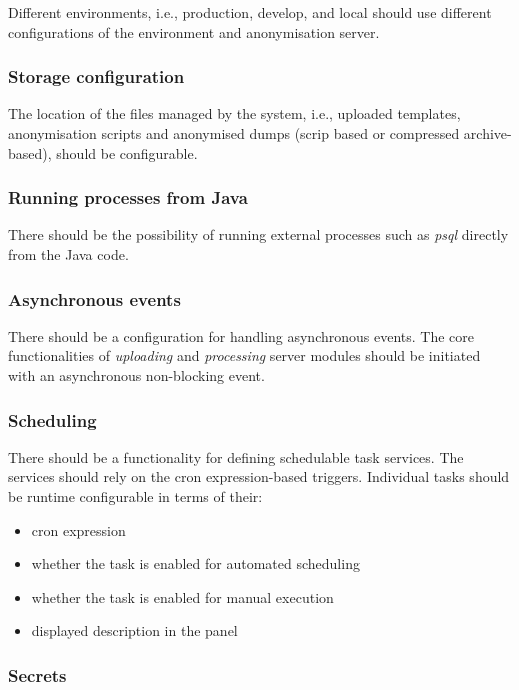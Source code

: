 \documentclass[a4paper,twoside,12pt]{book}
\begin{document}
Different environments, i.e., production, develop, and local should use different configurations of the environment and anonymisation server.

\subsubsection{Storage configuration}

The location of the files managed by the system, i.e., uploaded templates, anonymisation scripts and anonymised dumps (scrip based or compressed archive-based), should be configurable.

\subsubsection{Running processes from Java}

There should be the possibility of running external processes such as \textit{psql} directly from the Java code.

\subsubsection{Asynchronous events}

There should be a configuration for handling asynchronous events. The core functionalities of \textit{uploading} and \textit{processing} server modules should be initiated with an asynchronous non-blocking event.

\subsubsection{Scheduling}

There should be a functionality for defining schedulable task services. The services should rely on the cron expression-based triggers. Individual tasks should be runtime configurable in terms of their:

\begin{itemize}
\item cron expression
\item whether the task is enabled for automated scheduling
\item whether the task is enabled for manual execution
\item displayed description in the panel
\end{itemize}

\subsubsection{Secrets}
\end{document}
